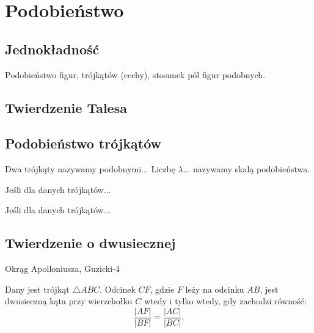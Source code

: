 %

\section{Podobieństwo}
\subsection{Jednokładność}
Podobieństwo figur, trójkątów (cechy), stosunek pól figur podobnych.

\subsection{Twierdzenie Talesa}


\subsection{Podobieństwo trójkątów}
\begin{definition}
	Dwa trójkąty nazywamy podobnymi...
	Liczbę $\lambda$... nazywamy skalą podobieństwa.
\end{definition}

\begin{proposition}
	Jeśli dla danych trójkątów...
\end{proposition}

\begin{proposition}
	Jeśli dla danych trójkątów...
\end{proposition}




\subsection{Twierdzenie o dwusiecznej}
Okrąg Apolloniusza, Guzicki-4

\begin{proposition}
	Dany jest trójkąt $\triangle ABC$.
	Odcinek $CF$, gdzie $F$ leży na odcinku $AB$, jest dwusieczną kąta przy wierzchołku $C$ wtedy i tylko wtedy, gdy zachodzi równość:
	\begin{equation}
		\frac{|AF|}{|BF|} = \frac{|AC|}{|BC|}.
	\end{equation}
\end{proposition}

